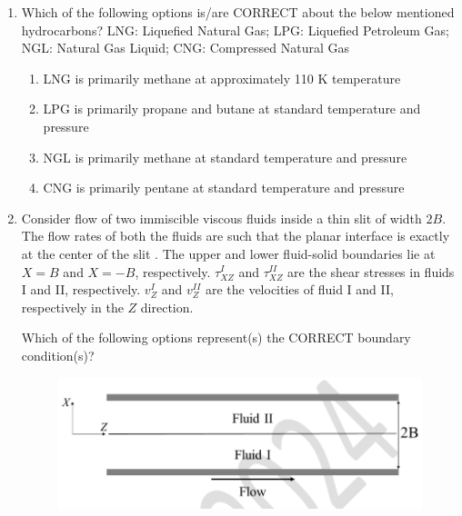 \documentclass[journal,12pt,onecolumn]{IEEEtran}
\theoremstyle{remark}
\begin{document}
\begin{enumerate}
\item  Which of the following options is/are CORRECT about the below mentioned hydrocarbons? 
LNG: Liquefied Natural Gas; LPG: Liquefied Petroleum Gas; NGL: Natural Gas Liquid; CNG: Compressed Natural Gas
\begin{enumerate}
    \item LNG is primarily methane at approximately 110 K temperature
    \item LPG is primarily propane and butane at standard temperature and pressure
    \item NGL is primarily methane at standard temperature and pressure
    \item CNG is primarily pentane at standard temperature and pressure
\end{enumerate}
\hfill{}




\item  Consider flow of two immiscible viscous fluids inside a thin slit of width $2B$. The flow rates of both the fluids are such that the planar interface is exactly at the center of the slit . The upper and lower fluid-solid boundaries lie at $X = B$ and $X = -B$, respectively. $\tau_{XZ}^I$ and $\tau_{XZ}^{II}$ are the shear stresses in fluids I and II, respectively. $v_Z^I$ and $v_Z^{II}$ are the velocities of fluid I and II, respectively in the $Z$ direction.

Which of the following options represent(s) the CORRECT boundary condition(s)?
\begin{figure}[h]
    \centering
    \includegraphics[width=0.5\columnwidth]{figs/im 12.jpeg}
    \caption{}
    \label{fig:placeholder}
\end{figure}

\begin{enumerate}
\end{enumerate}
\hfill{}




\end{enumerate}
\end{document}
